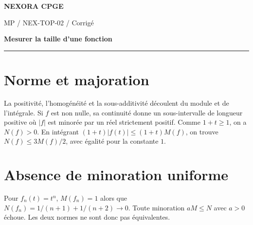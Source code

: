 \documentclass[11pt,a4paper]{article}
\begin{document}
{\small\bfseries\color{nexorablue} NEXORA CPGE}\par
{\small MP / NEX-TOP-02 / Corrigé}\par
{\LARGE\bfseries Mesurer la taille d’une fonction}\par
\vspace{0.25em}\hrule\vspace{0.6em}

\section*{Norme et majoration}
La positivité, l’homogénéité et la sous-additivité découlent du module et de l’intégrale. Si $f$ est non nulle, sa continuité donne un sous-intervalle de longueur positive où $|f|$ est minorée par un réel strictement positif. Comme $1+t\ge1$, on a $N(f)>0$. En intégrant $(1+t)|f(t)|\le(1+t)M(f)$, on trouve $N(f)\le3M(f)/2$, avec égalité pour la constante $1$.

\section*{Absence de minoration uniforme}
Pour $f_n(t)=t^n$, $M(f_n)=1$ alors que $N(f_n)=1/(n+1)+1/(n+2)\to0$. Toute minoration $aM\le N$ avec $a>0$ échoue. Les deux normes ne sont donc pas équivalentes.
\end{document}
